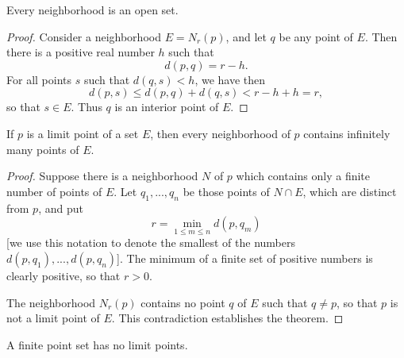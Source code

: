 \begin{thm}
    \label{thm:2.19}
    Every neighborhood is an open set.
\end{thm}
\begin{proof}
    Consider a neighborhood $E = N_r(p)$, 
    and let $q$ be any point of $E$.
    Then there is a positive real number $h$ such that
    \begin{equation*}
        d(p, q) = r - h.
    \end{equation*}
    For all points $s$ such that $d(q, s) < h$, we have then
    \begin{equation*}
        d(p, s) \leq d(p, q) + d(q, s) < r - h + h = r,
    \end{equation*}
    so that $s \in E$. 
    Thus $q$ is an interior point of $E$.
\end{proof}

\begin{thm}
    \label{thm:2.20}
    If $p$ is a limit point of a set $E$, then every neighborhood of $p$ contains infinitely many points of $E$.
\end{thm}

\begin{proof}
    Suppose there is a neighborhood $N$ of $p$ 
    which contains only a finite number of points of $E$. 
    Let $q_1, ... , q_n$ be those points of $N \cap E$,
    which are distinct from $p$, and put
    \begin{equation*}
        r = \min_{1 \leq m \leq n} d(p, q_m)
    \end{equation*}
    [we use this notation to denote the smallest of the numbers 
    $d(p, q_1), ..., d(p, q_n)$]. 
    The minimum of a finite set of positive numbers is clearly positive, 
    so that $r > 0$.

    The neighborhood $N_r(p)$ contains no point $q$ of $E$ such that $q \neq p$,
    so that $p$ is not a limit point of $E$. 
    This contradiction establishes the theorem.
\end{proof}

\begin{myCorollary*}
    A finite point set has no limit points.
\end{myCorollary*}

